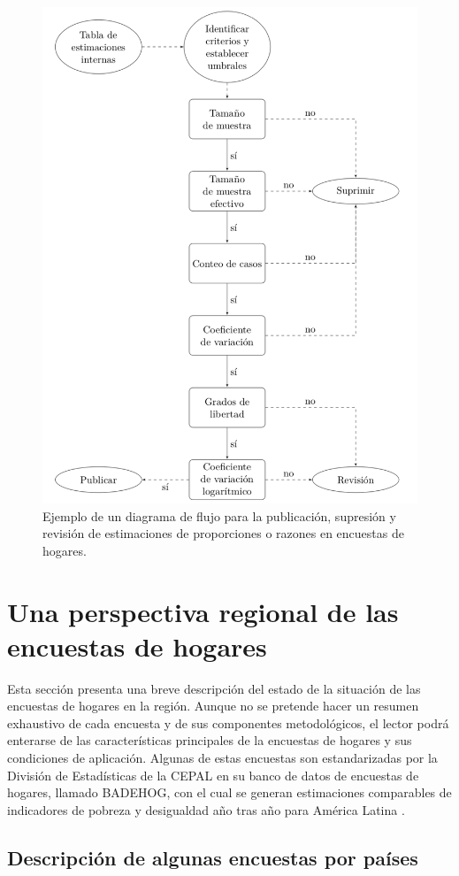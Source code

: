 \documentclass[
  12pt,
]{book}
\begin{document}
\begin{figure}
\includegraphics[width=0.5\linewidth]{Pics/CSj1} \caption{Ejemplo de un diagrama de flujo para la publicación, supresión y revisión de estimaciones de proporciones o razones en encuestas de hogares.}\label{fig:figCSj1}
\end{figure}

\hypertarget{appendix-appendix}{%
\appendix}


\hypertarget{una-perspectiva-regional-de-las-encuestas-de-hogares}{%
\chapter{Una perspectiva regional de las encuestas de hogares}\label{una-perspectiva-regional-de-las-encuestas-de-hogares}}

Esta sección presenta una breve descripción del estado de la situación de las encuestas de hogares en la región. Aunque no se pretende hacer un resumen exhaustivo de cada encuesta y de sus componentes metodológicos, el lector podrá enterarse de las características principales de la encuestas de hogares y sus condiciones de aplicación. Algunas de estas encuestas son estandarizadas por la División de Estadísticas de la CEPAL en su banco de datos de encuestas de hogares, llamado BADEHOG, con el cual se generan estimaciones comparables de indicadores de pobreza y desigualdad año tras año para América Latina \citep{BADEHOG}.

\hypertarget{descripciuxf3n-de-algunas-encuestas-por-pauxedses}{%
\section{Descripción de algunas encuestas por países}\label{descripciuxf3n-de-algunas-encuestas-por-pauxedses}}
\end{document}
